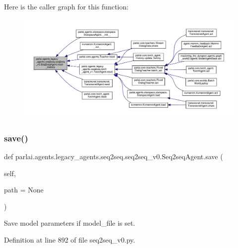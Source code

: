 Here is the caller graph for this function\+:
\nopagebreak
\begin{figure}[H]
\begin{center}
\leavevmode
\includegraphics[width=350pt]{classparlai_1_1agents_1_1legacy__agents_1_1seq2seq_1_1seq2seq__v0_1_1Seq2seqAgent_ae76435bf7acee9501188de47c0ba6991_icgraph}
\end{center}
\end{figure}
\mbox{\label{classparlai_1_1agents_1_1legacy__agents_1_1seq2seq_1_1seq2seq__v0_1_1Seq2seqAgent_a31c017cd07b01834a5d467fadfddd7cd}} 
\subsubsection{\texorpdfstring{save()}{save()}}
{\footnotesize\ttfamily def parlai.\+agents.\+legacy\+\_\+agents.\+seq2seq.\+seq2seq\+\_\+v0.\+Seq2seq\+Agent.\+save (\begin{DoxyParamCaption}\item[{}]{self,  }\item[{}]{path = {\ttfamily None} }\end{DoxyParamCaption})}

\begin{DoxyVerb}Save model parameters if model_file is set.\end{DoxyVerb}
 

Definition at line 892 of file seq2seq\+\_\+v0.\+py.



